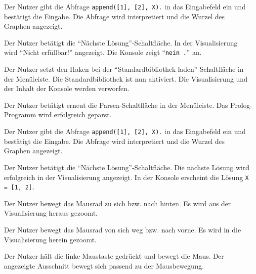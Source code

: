 \documentclass[parskip=full,11pt,twoside]{scrartcl}
\begin{document}
{Der Nutzer gibt die Abfrage \texttt{append([1], [2], X).} in das Eingabefeld ein und bestätigt die Eingabe.}
{Die Abfrage wird interpretiert und die Wurzel des Graphen angezeigt.}

{Der Nutzer betätigt die \enquote{Nächste Lösung}-Schaltfläche.}
{In der Visualisierung wird \enquote{Nicht erfüllbar!} angezeigt. Die Konsole zeigt \enquote{\texttt{nein .}} an.}

{Der Nutzer setzt den Haken bei der \enquote{Standardbibliothek laden}-Schaltfläche in der Menüleiste.}
{Die Standardbibliothek ist nun aktiviert. Die Visualisierung und der Inhalt der Konsole werden verworfen.}

{Der Nutzer betätigt erneut die Parsen-Schaltfläche in der Menüleiste.}
{Das Prolog-Programm wird erfolgreich geparst.}

{Der Nutzer gibt die Abfrage \texttt{append([1], [2], X).} in das Eingabefeld ein und bestätigt die Eingabe.}
{Die Abfrage wird interpretiert und die Wurzel des Graphen angezeigt.}

{Der Nutzer betätigt die \enquote{Nächste Lösung}-Schaltfläche.}
{Die nächste Lösung wird erfolgreich in der Visualisierung angezeigt. In der Konsole erscheint die Lösung \texttt{X = [1, 2]}.}


{Der Nutzer bewegt das Mausrad zu sich bzw. nach hinten.}
{Es wird aus der Visualisierung heraus gezoomt.}

{Der Nutzer bewegt das Mausrad von sich weg bzw. nach vorne.}
{Es wird in die Visualisierung herein gezoomt.}


{Der Nutzer hält die linke Maustaste gedrückt und bewegt die Maus.}
{Der angezeigte Ausschnitt bewegt sich passend zu der Mausbewegung.}
\end{document}
